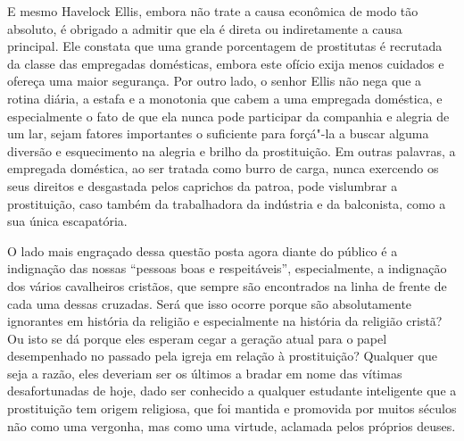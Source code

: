 E mesmo Havelock Ellis, embora não trate a causa econômica de modo tão
absoluto, é obrigado a admitir que ela é direta ou indiretamente a causa
principal. Ele constata que uma grande porcentagem de prostitutas é
recrutada da classe das empregadas domésticas, embora este ofício
exija menos cuidados e ofereça uma maior segurança. Por outro lado, o
senhor Ellis não nega que a rotina diária, a estafa e a monotonia que
cabem a uma empregada doméstica, e especialmente o fato de que ela nunca
pode participar da companhia e alegria de um lar, sejam fatores
importantes o suficiente para forçá"-la a buscar alguma diversão e
esquecimento na alegria e brilho da prostituição. Em outras palavras, a
empregada doméstica, ao ser tratada como burro de carga, nunca exercendo
os seus direitos e desgastada pelos caprichos da patroa, pode vislumbrar
a prostituição, caso também da trabalhadora da indústria e da balconista, como a sua única escapatória.

O lado mais engraçado dessa questão posta agora diante do público é a
indignação das nossas ``pessoas boas e respeitáveis'', especialmente, a
indignação dos vários cavalheiros cristãos, que sempre são encontrados na
linha de frente de cada uma dessas cruzadas. Será que isso ocorre porque são absolutamente ignorantes em história da religião e especialmente
na história da religião cristã? Ou isto se dá porque eles esperam cegar
a geração atual para o papel desempenhado no passado pela igreja em
relação à prostituição? Qualquer que seja a razão, eles deveriam ser os
últimos a bradar em nome das vítimas desafortunadas de hoje, dado ser
conhecido a qualquer estudante inteligente que a prostituição tem origem
religiosa, que foi mantida e promovida por muitos séculos não como uma
vergonha, mas como uma virtude, aclamada pelos próprios deuses.

